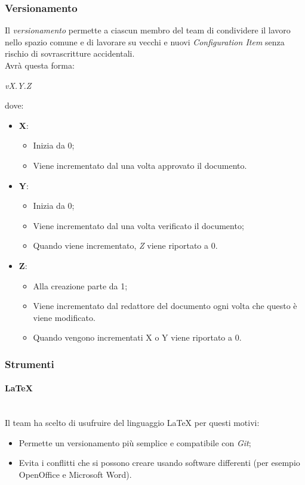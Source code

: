 	\subsubsection{Versionamento}
	Il \emph{versionamento} permette a ciascun membro del team di condividere il lavoro nello spazio comune e di lavorare su vecchi e nuovi \emph{Configuration Item} senza rischio di sovrascritture accidentali.
	\\Avrà questa forma:
	\begin{center}
		\emph{vX.Y.Z}
	\end{center}
	dove:
	\begin{itemize}
		\item \textbf{X}:
		\begin{itemize}
			\item Inizia da 0;
			\item Viene incrementato dal \RdP{} una volta approvato il documento.
		\end{itemize}
		\item \textbf{Y}:
		\begin{itemize}
			\item Inizia da 0;
			\item Viene incrementato dal \ver{} una volta verificato il documento;
			\item Quando viene incrementato, \emph{Z} viene riportato a 0.
		\end{itemize}
		\item \textbf{Z}:
		\begin{itemize}
			\item Alla creazione parte da 1;
			\item Viene incrementato dal redattore del documento ogni volta che questo è viene modificato.
			\item Quando vengono incrementati X o Y viene riportato a 0.
		\end{itemize}
	\end{itemize}
	\subsubsection{Strumenti}
			\paragraph{\LaTeX}
			~\\Il team ha scelto di usufruire del linguaggio \LaTeX{} per questi motivi:
			\begin{itemize}
				\item Permette un versionamento più semplice e compatibile con \emph{Git};
				\item Evita i conflitti che si possono creare usando software differenti (per esempio OpenOffice e Microsoft Word).
			\end{itemize}
		
